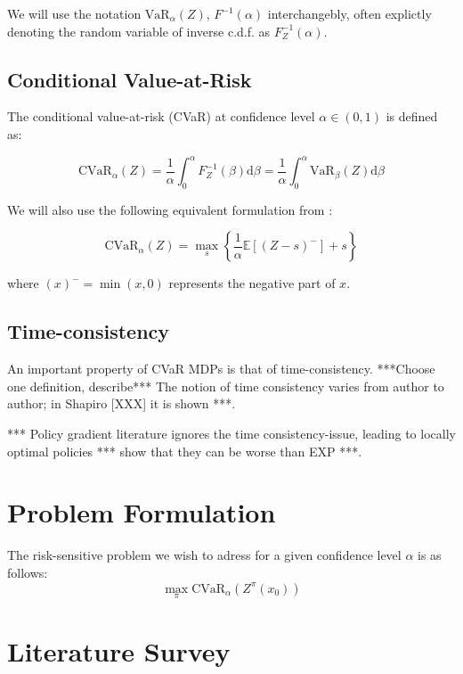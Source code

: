 We will use the notation $\text{VaR}_\alpha(Z)$, $F^{-1}(\alpha)$ interchangebly, often explictly denoting the random variable of inverse c.d.f. as $F^{-1}_Z(\alpha)$.

\subsection{Conditional Value-at-Risk}
The conditional value-at-risk (CVaR) at confidence level $\alpha \in (0,1)$ is defined as:

\begin{equation}
\text{CVaR}_\alpha(Z) = \dfrac{1}{\alpha}\int_0^\alpha F^{-1}_Z(\beta) \text{d}\beta = \dfrac{1}{\alpha}\int_0^\alpha \text{VaR}_\beta(Z) \text{d}\beta
\end{equation}

We will also use the following equivalent formulation from \cite{rockafellar2000optimization}:

\begin{equation}\label{eq:cvardef}
\text{CVaR}_\alpha(Z)=
\max_s\left\lbrace \dfrac{1}{\alpha}\mathbb{E}
\left[ (Z-s)^-\right] + s  \right\rbrace 
\end{equation}

where $(x)^- = \min(x, 0)$ represents the negative part of $x$.


\subsection{Time-consistency}
An important property of CVaR MDPs is that of time-consistency. ***Choose one definition, describe*** The notion of time consistency varies from author to author; in Shapiro [XXX] it is shown ***.

*** Policy gradient literature ignores the time consistency-issue, leading to locally optimal policies *** show that they can be worse than EXP ***.



\section{Problem Formulation}\label{sec:prelim:problem}


The risk-sensitive problem we wish to adress for a given confidence level $\alpha$ is as follows:
\begin{equation}
\max_\pi \text{CVaR}_\alpha(Z^\pi(x_0))
\end{equation}




\section{Literature Survey}\label{sec:prelim:literature}


